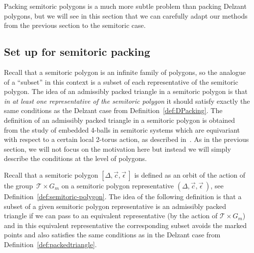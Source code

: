 \documentclass[pdftex]{sigma}
\numberwithin{equation}{section}
\newcommand{\De}{\Delta}
\newcommand{\stpoly}{[\De,\vec{c},\vec{\epsilon}\,]}
\newcommand{\strep}{(\De,\vec{c},\vec{\epsilon}\,)}
\begin{document}
Packing semitoric polygons is a much more subtle problem than packing Delzant polygons, but we will see in this section that we can carefully adapt our methods from the previous section to the semitoric case.


\subsection{Set up for semitoric packing}
\label{sec:semitoric-setup}

Recall that a semitoric polygon is an infinite family of polygons, so the analogue of a ``subset'' in this context is a subset of each representative of the semitoric polygon.
The idea of an admissibly packed triangle in a semitoric polygon is that \textit{in at least one representative of the semitoric polygon} it should satisfy exactly the same conditions as the Delzant case from Definition~\ref{def:DPacking}.
The definition of an admissibly packed triangle in a semitoric polygon is obtained from the study of embedded 4-balls in semitoric systems which are equivariant with respect to a certain local 2-torus action, as described in~\cite{FiPaPe2016}.
As in the previous section, we will not focus on the motivation here but instead we will simply describe the conditions at the level of polygons.



Recall that a semitoric polygon $\stpoly$ is defined as an orbit of the action of the group~$\mathcal{T}\times G_m$ on a semitoric polygon representative $\strep$, see Definition~\ref{def:semitoric-polygon}.
The idea of the following definition is that a subset of a given semitoric polygon representative is an admissibly packed triangle if we can pass to an equivalent representative (by the action of $\mathcal{T}\times G_m$) and in this equivalent representative the corresponding subset avoids the marked points and also satisfies the same conditions as in the Delzant case from Definition~\ref{def:packedtriangle}.
\end{document}

